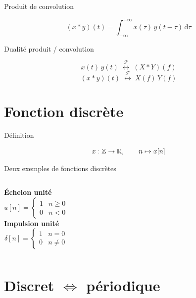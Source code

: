 \documentclass[aspectratio=43,10pt]{beamer}
\newcommand{\tf}{\overset{\mathcal F}{\longleftrightarrow}}
\begin{document}
\begin{frame}{Produit de convolution}
    \begin{center}
        \Large
        $$(x*y)(t) = \int_{-\infty}^{+\infty} x(\tau)\,y(t-\tau)\,\mathrm d\tau$$
    \end{center}
\end{frame}

\begin{frame}{Dualité produit / convolution}
    \begin{center}
        \Large
        $$x(t)\,y(t) \;\tf\; (X*Y)(f)$$
        \vspace{0.5em}
        $$(x*y)(t) \;\tf\; X(f)\,Y(f)$$
    \end{center}
\end{frame}

\section{Fonction discrète}


\begin{frame}{Définition}
    \begin{center}
        \Large
        $$x:{\mathbb{Z}}\to{\mathbb{R}},\qquad n\mapsto x[n]$$
    \end{center}
\end{frame}

\begin{frame}{Deux exemples de fonctions discrètes}
    \begin{columns}
        \centering
        \textbf{Échelon unité}
        $$u[n] = \begin{cases} 1 & n\geq0 \\ 0 & n<0 \end{cases}$$
        \centering
        \textbf{Impulsion unité}
        $$\delta[n] = \begin{cases} 1 & n=0 \\ 0 & n\neq0 \end{cases}$$
    \end{columns}
\end{frame}

\section{Discret \texorpdfstring{$\Leftrightarrow$}{<=>} périodique}
\end{document}
